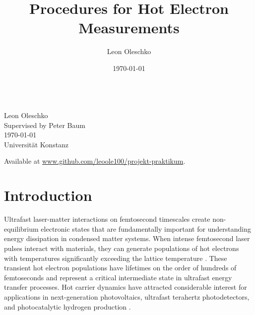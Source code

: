 \documentclass[
	parskip=half,
	a4paper,
]{scrarticle}
\begin{document}
\title{Procedures for Hot Electron Measurements}
\author{Leon Oleschko}
\date{\dotdate\today}

\begin{titlepage}
    \sffamily
    \vspace*{3cm}
    {
        \fontsize{32}{32}
    }
    \vspace{.25cm}\\
    {
        \Large
        Leon Oleschko\\
        Supervised by Peter Baum
        \vspace{.05cm}\\
        \dotdate\today\\
        Universität Konstanz
    }
    \vfill
    {
        \normalfont\normalsize

    }
    \vfill
    \begin{flushright}
        Available at \url{www.github.com/leoole100/projekt-praktikum}.
    \end{flushright}
\end{titlepage}


\clearpage
\section{Introduction}
Ultrafast laser-matter interactions on femtosecond timescales create non-equilibrium electronic states that are fundamentally important for understanding energy dissipation in condensed matter systems. When intense femtosecond laser pulses interact with materials, they can generate populations of hot electrons with temperatures significantly exceeding the lattice temperature \cite{lui_ultrafast_2010}. 
These transient hot electron populations have lifetimes on the order of hundreds of femtoseconds \cite{stange_hot_2015} and represent a critical intermediate state in ultrafast energy transfer processes. 
Hot carrier dynamics have attracted considerable interest for applications in next-generation photovoltaics, ultrafast terahertz photodetectors, and photocatalytic hydrogen production \cite{tang_plasmonic_2020,konig_hot_2010}.
\end{document}
